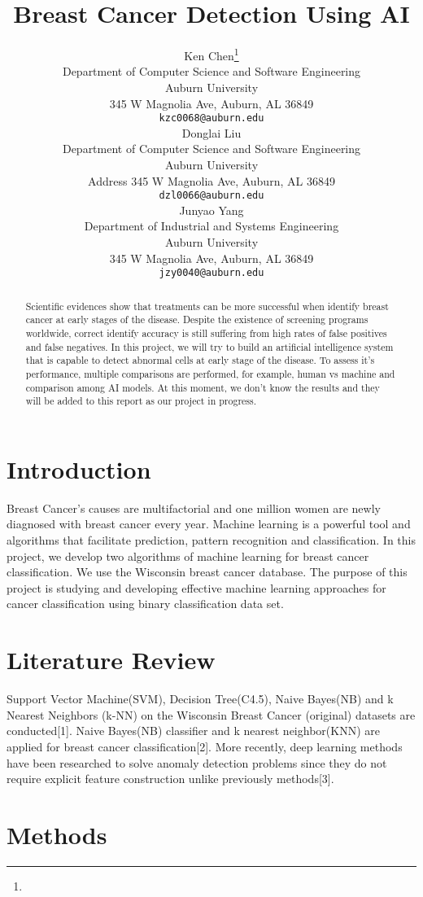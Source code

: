 \documentclass{article} %
\title{Breast Cancer Detection Using AI}
\author{
Ken Chen\thanks{} \\
Department of Computer Science and Software Engineering\\
Auburn University\\
345 W Magnolia Ave, Auburn, AL 36849 \\
\texttt{kzc0068@auburn.edu} \\
\And
Donglai Liu \\
Department of Computer Science and Software Engineering \\
Auburn University\\
Address 345 W Magnolia Ave, Auburn, AL 36849\\
\texttt{dzl0066@auburn.edu} \\
\AND
Junyao Yang \\
Department of Industrial and Systems Engineering \\
Auburn University\\
345 W Magnolia Ave, Auburn, AL 36849 \\
\texttt{jzy0040@auburn.edu} \\
}
\begin{document}
\maketitle

\begin{abstract}
Scientific evidences show that treatments can be more successful when identify breast cancer at early stages of the disease. Despite the existence of screening programs worldwide, correct identify accuracy is still suffering from high rates of false positives and false negatives. 
In this project, we will try to build an artificial intelligence system that is capable to detect abnormal cells at early stage of the disease. To assess it's performance, multiple comparisons are performed, for example, human vs machine and comparison among AI models. At this moment, we don't know the results and they will be added to this report as our project in progress. 
\end{abstract}

\section{Introduction}
Breast Cancer's causes are multifactorial and one million women are newly diagnosed with breast cancer every year. Machine learning is a powerful tool and algorithms that facilitate prediction, pattern recognition and classification. In this project, we develop two algorithms of machine learning for breast cancer classification. We use the Wisconsin breast cancer database. The purpose of this project is studying and developing effective machine learning approaches for cancer classification using binary classification data set.

\section{Literature Review}
\label{gen_inst}
Support Vector Machine(SVM), Decision Tree(C4.5), Naive Bayes(NB) and k Nearest Neighbors (k-NN) on the Wisconsin Breast Cancer (original) datasets are conducted[1]. Naive Bayes(NB) classifier and k nearest neighbor(KNN) are applied for breast cancer classification[2]. More recently, deep learning methods have been researched to solve anomaly detection problems since they do not require explicit feature construction unlike previously methods[3].


\section{Methods}
\label{headings}
\end{document}
